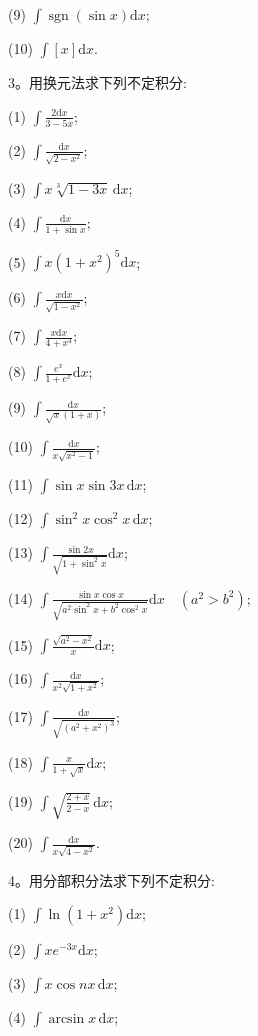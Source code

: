 (9) $\displaystyle \int\operatorname{sgn}(\sin x)\mathrm dx$;

(10) $\displaystyle \int[x]\mathrm dx$.

3。用换元法求下列不定积分:

(1) $\displaystyle \int\frac{2\mathrm dx}{3-5x}$;

(2) $\displaystyle \int\frac{\mathrm dx}{\sqrt{2-x^2}}$;

(3) $\displaystyle \int x\sqrt[3]{1-3x}\,\mathrm dx$;

(4) $\displaystyle \int\frac{\mathrm dx}{1+\sin x}$;

(5) $\displaystyle \int x(1+x^2)^5\mathrm dx$;

(6) $\displaystyle \int\frac{x\mathrm dx}{\sqrt{1-x^2}}$;

(7) $\displaystyle \int\frac{x\mathrm dx}{4+x^4}$;

(8) $\displaystyle \int\frac{e^x}{1+e^x}\mathrm dx$;

(9) $\displaystyle \int\frac{\mathrm dx}{\sqrt x(1+x)}$;

(10) $\displaystyle \int\frac{\mathrm dx}{x\sqrt{x^2-1}}$;

(11) $\displaystyle \int\sin x\sin3x\,\mathrm dx$;

(12) $\displaystyle \int\sin^2x\cos^2x\,\mathrm dx$;

(13) $\displaystyle \int\frac{\sin2x}{\sqrt{1+\sin^2x}}\mathrm dx$;

(14) $\displaystyle \int\frac{\sin x\cos x}{\sqrt{a^2\sin^2x+b^2\cos^2x}}\mathrm dx\quad(a^2>b^2)$;

(15) $\displaystyle \int\frac{\sqrt{a^2-x^2}}x\mathrm dx$;

(16) $\displaystyle \int\frac{\mathrm dx}{x^2\sqrt{1+x^2}}$;

(17) $\displaystyle \int\frac{\mathrm dx}{\sqrt{(a^2+x^2)^3}}$;

(18) $\displaystyle \int\frac{x}{1+\sqrt x}\mathrm dx$;

(19) $\displaystyle \int\sqrt{\frac{2+x}{2-x}}\,\mathrm dx$;

(20) $\displaystyle \int\frac{\mathrm dx}{x\sqrt{4-x^2}}$.

4。用分部积分法求下列不定积分:

(1) $\displaystyle \int\ln(1+x^2)\mathrm dx$;

(2) $\displaystyle \int xe^{-3x}\mathrm dx$;

(3) $\displaystyle \int x\cos nx\,\mathrm dx$;

(4) $\displaystyle \int\arcsin x\,\mathrm dx$;

